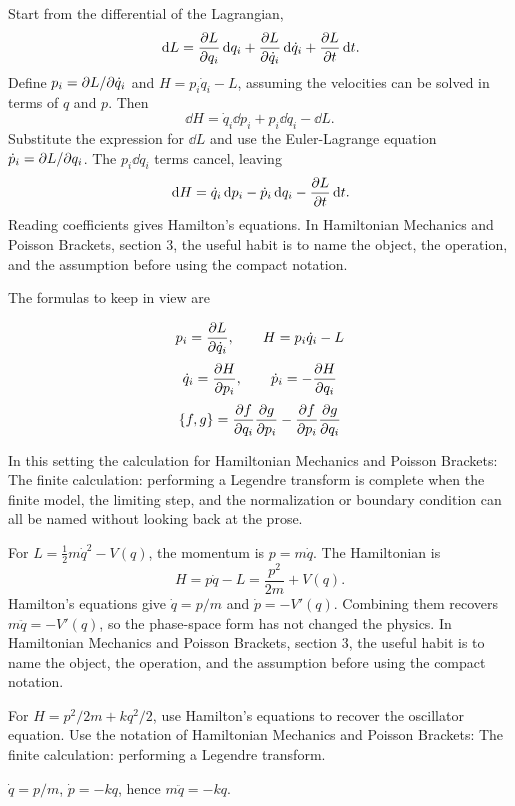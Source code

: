Start from the differential of the Lagrangian,
\[
  \,\mathrm d L=\frac{\partial L}{\partial q_i}\,\mathrm d q_i+\frac{\partial L}{\partial\dot q_i}\,\mathrm d\dot q_i+\frac{\partial L}{\partial t}\,\mathrm d t.
\]
Define \(p_i=\partial L/\partial\dot q_i\) and \(H=p_i\dot q_i-L\), assuming the velocities can be solved in terms of \(q\) and \(p\).  Then
\[
  \dd H=\dot q_i\dd p_i+p_i\dd\dot q_i-\dd L.
\]
Substitute the expression for \(\dd L\) and use the Euler-Lagrange equation \(\dot p_i=\partial L/\partial q_i\).  The \(p_i\dd\dot q_i\) terms cancel, leaving
\[
  \,\mathrm d H=\dot q_i\,\mathrm d p_i-\dot p_i\,\mathrm d q_i-\frac{\partial L}{\partial t}\,\mathrm d t.
\]
Reading coefficients gives Hamilton's equations.  In Hamiltonian Mechanics and Poisson Brackets, section 3, the useful habit is to name the object, the operation, and the assumption before using the compact notation.

The formulas to keep in view are

\[
  p_i=\frac{\partial L}{\partial\dot q_i},\qquad H=p_i\dot q_i-L
\]
\[
  \dot q_i=\frac{\partial H}{\partial p_i},\qquad \dot p_i=-\frac{\partial H}{\partial q_i}
\]
\[
  \{f,g\}=\frac{\partial f}{\partial q_i}\frac{\partial g}{\partial p_i}-\frac{\partial f}{\partial p_i}\frac{\partial g}{\partial q_i}
\]

In this setting the calculation for Hamiltonian Mechanics and Poisson Brackets: The finite calculation: performing a Legendre transform is complete when the finite model, the limiting step, and the normalization or boundary condition can all be named without looking back at the prose.




\begin{example}
For \(L=\frac12m\dot q^2-V(q)\), the momentum is \(p=m\dot q\).  The Hamiltonian is
\[
  H=p\dot q-L=\frac{p^2}{2m}+V(q).
\]
Hamilton's equations give \(\dot q=p/m\) and \(\dot p=-V'(q)\).  Combining them recovers \(m\ddot q=-V'(q)\), so the phase-space form has not changed the physics.  In Hamiltonian Mechanics and Poisson Brackets, section 3, the useful habit is to name the object, the operation, and the assumption before using the compact notation.
\end{example}



\begin{exercise}
For \(H=p^2/2m+kq^2/2\), use Hamilton's equations to recover the oscillator equation.  Use the notation of Hamiltonian Mechanics and Poisson Brackets: The finite calculation: performing a Legendre transform.
\begin{answer}
\(\dot q=p/m\), \(\dot p=-kq\), hence \(m\ddot q=-kq\).
\end{answer}
\end{exercise}

